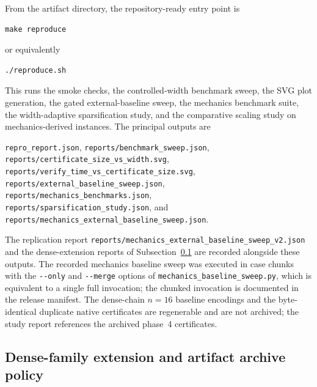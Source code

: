 From the artifact directory, the repository-ready entry point is
\begin{verbatim}
make reproduce
\end{verbatim}
or equivalently
\begin{verbatim}
./reproduce.sh
\end{verbatim}
This runs the smoke checks, the controlled-width benchmark sweep, the SVG plot
generation, the gated external-baseline sweep, the mechanics benchmark suite,
the width-adaptive sparsification study, and the comparative scaling study on
mechanics-derived instances. The principal outputs are
\begin{center}
\texttt{repro\_report.json}, \texttt{reports/benchmark\_sweep.json},\\
\texttt{reports/certificate\_size\_vs\_width.svg},\\
\texttt{reports/verify\_time\_vs\_certificate\_size.svg},\\
\texttt{reports/external\_baseline\_sweep.json},\\
\texttt{reports/mechanics\_benchmarks.json},\\
\texttt{reports/sparsification\_study.json}, and\\
\texttt{reports/mechanics\_external\_baseline\_sweep.json}.
\end{center}
The replication report
\texttt{reports/mechanics\_external\_baseline\_sweep\_v2.json} and the
dense-extension reports of Subsection~\ref{subsec:dense-extension} are recorded
alongside these outputs.
The recorded mechanics baseline sweep was executed in case chunks with the
\texttt{-{}-only} and \texttt{-{}-merge} options of
\texttt{mechanics\_baseline\_sweep.py}, which is equivalent to a single full
invocation; the chunked invocation is documented in the release manifest. The
dense-chain $n=16$ baseline encodings and the byte-identical duplicate native
certificates are regenerable and are not archived; the study report references
the archived phase~4 certificates.

\subsection{Dense-family extension and artifact archive policy}
\label{subsec:dense-extension}

